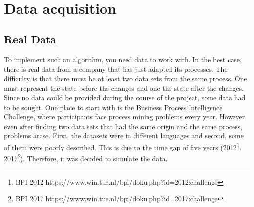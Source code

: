 \chapter{Data acquisition}

    \section{Real Data}
    To implement such an algorithm, you need data to work with. In the best case, there is real data from a company that has just adapted its processes. The difficulty is that there must be at least two data sets from the same process. One must represent the state before the changes and one the state after the changes.\\
    Since no data could be provided during the course of the project, some data had to be sought. One place to start with is the Business Process Intelligence Challenge, where participants face process mining problems every year. However, even after finding two data sets that had the same origin and the same process, problems arose. First, the datasets were in different languages and second, some of them were poorly described. This is due to the time gap of five years (2012\footnote{BPI 2012 https://www.win.tue.nl/bpi/doku.php?id=2012:challenge}, 2017\footnote{BPI 2017 https://www.win.tue.nl/bpi/doku.php?id=2017:challenge}). Therefore, it was decided to simulate the data.

